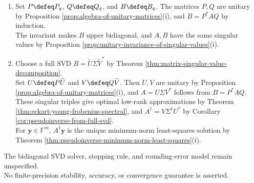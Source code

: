 \begin{computationmethod}
\begin{enumerate}[label=(\roman*)]
\begin{enumerate}[label=(\alph*)]
\item If $k=n$, set $R_k\defeq I_n$. Otherwise, let $\mathbf{w}_k^*$ be row $k$ of $C_k$ in columns $k+1,\ldots,n$.\\
If $\mathbf{w}_k=\mathbf{0}$, set $\widehat{R}_k\defeq I_{n-k}$. Otherwise, choose a unitary $\widehat{R}_k$ satisfying $\widehat{R}_k\mathbf{e}_1=\frac{\mathbf{w}_k}{\norm{\mathbf{w}_k}_2}$ by Corollary \ref{cor:householder-unitary-annihilator}(iii).\\
Then $\mathbf{w}_k^*\widehat{R}_k=\norm{\mathbf{w}_k}_2\mathbf{e}_1^*$. Let $R_k$ act as $\widehat{R}_k$ on columns $k+1,\ldots,n$ and as the identity on earlier coordinates.
\end{enumerate}
Set $B_k\defeq L_k^*B_{k-1}R_k$, $P_k\defeq P_{k-1}L_k$, and $Q_k\defeq Q_{k-1}R_k$.\\
Writing $B_k=[b_{ij}^{(k)}]$, the column invariant is $(\forall\,j\in J_k)(\forall\,i\in J_m)\,i>j\Longrightarrow b_{ij}^{(k)}=0$.\\
The row invariant is $(\forall\,i\in J_k)(\forall\,j\in J_n)\,j>i+1\Longrightarrow b_{ij}^{(k)}=0$; trailing-coordinate actions preserve both.
\item Set $P\defeq P_q$, $Q\defeq Q_q$, and $B\defeq B_q$. The matrices $P,Q$ are unitary by Proposition \ref{prop:algebra-of-unitary-matrices}(i), and $B=P^*AQ$ by induction.\\
The invariant makes $B$ upper bidiagonal, and $A,B$ have the same singular values by Proposition \ref{prop:unitary-invariance-of-singular-values}(i).
\item Choose a full SVD $B=\widetilde{U}\Sigma\widetilde{V}^*$ by Theorem \ref{thm:matrix-singular-value-decomposition}.\\
Set $U\defeq P\widetilde{U}$ and $V\defeq Q\widetilde{V}$. Then $U,V$ are unitary by Proposition \ref{prop:algebra-of-unitary-matrices}(i), and $A=U\Sigma V^*$ follows from $B=P^*AQ$.\\
These singular triples give optimal low-rank approximations by Theorem \ref{thm:eckart-young-frobenius-spectral}, and $A^{\dagger}=V\Sigma^{\dagger}U^*$ by Corollary \ref{cor:pseudoinverse-from-full-svd}.\\
For $\mathbf{y}\in\mathbb{F}^m$, $A^{\dagger}\mathbf{y}$ is the unique minimum-norm least-squares solution by Theorem \ref{thm:pseudoinverse-minimum-norm-least-squares}(i).
\end{enumerate}
The bidiagonal SVD solver, stopping rule, and rounding-error model remain unspecified.\\
No finite-precision stability, accuracy, or convergence guarantee is asserted.
\end{computationmethod}
